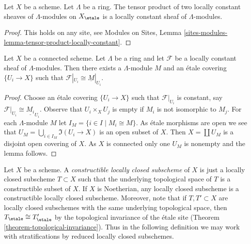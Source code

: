 \begin{lemma}
\label{lemma-tensor-product-locally-constant}
Let $X$ be a scheme. Let $\Lambda$ be a ring.
The tensor product of two locally constant sheaves of $\Lambda$-modules
on $X_\etale$ is a locally constant sheaf of $\Lambda$-modules.
\end{lemma}

\begin{proof}
This holds on any site, see
Modules on Sites, Lemma
\ref{sites-modules-lemma-tensor-product-locally-constant}.
\end{proof}

\begin{lemma}
\label{lemma-connected-locally-constant}
Let $X$ be a connected scheme. Let $\Lambda$ be a ring and let
$\mathcal{F}$ be a locally constant sheaf of $\Lambda$-modules.
Then there exists a $\Lambda$-module $M$ and an \'etale covering
$\{U_i \to X\}$ such that $\mathcal{F}|_{U_i} \cong \underline{M}|_{U_i}$.
\end{lemma}

\begin{proof}
Choose an \'etale covering
$\{U_i \to X\}$ such that $\mathcal{F}|_{U_i}$ is constant, say
$\mathcal{F}|_{U_i} \cong \underline{M_i}_{U_i}$.
Observe that $U_i \times_X U_j$ is empty if $M_i$ is not isomorphic
to $M_j$.
For each $\Lambda$-module $M$ let $I_M = \{i \in I \mid M_i \cong M\}$.
As \'etale morphisms are open we see that
$U_M = \bigcup_{i \in I_M} \Im(U_i \to X)$
is an open subset of $X$. Then $X = \coprod U_M$ is a disjoint
open covering of $X$. As $X$ is connected only one $U_M$ is nonempty
and the lemma follows.
\end{proof}

\noindent
Let $X$ be a scheme. A {\it constructible locally closed subscheme} of $X$
is just a locally closed subscheme $T \subset X$ such that the underlying
topological space of $T$ is a constructible subset of $X$. If $X$ is
Noetherian, any locally closed subscheme is a constructible locally
closed subscheme. Moreover, note that if $T, T' \subset X$ are locally
closed subschemes with the same underlying topological space, then
$T_\etale \cong T'_\etale$ by the topological
invariance of the \'etale site (Theorem \ref{theorem-topological-invariance}).
Thus in the following definition we may work with stratifications
by reduced locally closed subschemes.


